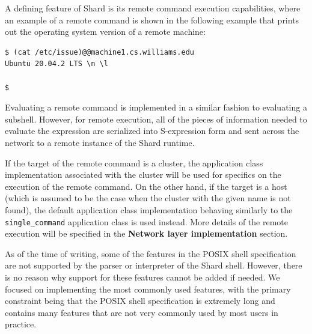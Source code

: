 \documentclass[oneside]{report}
\newcommand{\todoi}[1]{\todo[inline, color=blue!20]{TODO: {#1}}}
\begin{document}
A defining feature of Shard is its remote command execution capabilities, where an example of a remote command is shown in the following example that prints out the operating system version of a remote machine:

\begin{minipage}[c]{\textwidth-15pt}
  \begin{lstlisting}[language=shard]
$ (cat /etc/issue)@@machine1.cs.williams.edu
Ubuntu 20.04.2 LTS \n \l

$
\end{lstlisting}
  \smallskip
\end{minipage}

Evaluating a remote command is implemented in a similar fashion to evaluating a subshell.
However, for remote execution, all of the pieces of information needed to evaluate the expression are serialized into S-expression form and sent across the network to a remote instance of the Shard runtime.

If the target of the remote command is a cluster, the application class implementation associated with the cluster will be used for specifics on the execution of the remote command.
On the other hand, if the target is a host (which is assumed to be the case when the cluster with the given name is not found), the default application class implementation behaving similarly to the \texttt{single\_command} application class is used instead.
More details of the remote execution will be specified in the \textbf{Network layer implementation} section.


As of the time of writing, some of the features in the POSIX shell specification are not supported by the parser or interpreter of the Shard shell.
However, there is no reason why support for these features cannot be added if needed.
We focused on implementing the most commonly used features, with the primary constraint being that the POSIX shell specification is extremely long and contains many features that are not very commonly used by most users in practice.
\end{document}
